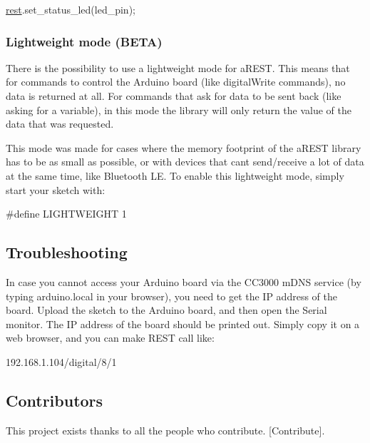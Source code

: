 \begin{DoxyCode}
\hyperlink{nodemcu_8cpp_a26fae33ed4ee26417d9384858ac417f7}{rest}.set\_status\_led(led\_pin);
\end{DoxyCode}


\subsubsection*{Lightweight mode (B\+E\+TA)}

There is the possibility to use a lightweight mode for a\+R\+E\+ST. This means that for commands to control the Arduino board (like digital\+Write commands), no data is returned at all. For commands that ask for data to be sent back (like asking for a variable), in this mode the library will only return the value of the data that was requested.

This mode was made for cases where the memory footprint of the a\+R\+E\+ST library has to be as small as possible, or with devices that can\textquotesingle{}t send/receive a lot of data at the same time, like Bluetooth LE. To enable this lightweight mode, simply start your sketch with\+:


\begin{DoxyCode}
\textcolor{preprocessor}{#define LIGHTWEIGHT 1}
\end{DoxyCode}


\subsection*{Troubleshooting}

In case you cannot access your Arduino board via the C\+C3000 m\+D\+NS service (by typing arduino.\+local in your browser), you need to get the IP address of the board. Upload the sketch to the Arduino board, and then open the Serial monitor. The IP address of the board should be printed out. Simply copy it on a web browser, and you can make R\+E\+ST call like\+:


\begin{DoxyCode}
192.168.1.104/digital/8/1
\end{DoxyCode}


\subsection*{Contributors}

This project exists thanks to all the people who contribute. \mbox{[}Contribute\mbox{]}. \href{graphs/contributors}{\tt }

